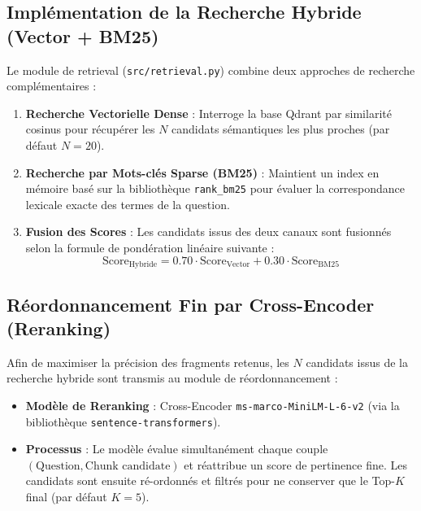 \subsection{Implémentation de la Recherche Hybride (Vector + BM25)}
Le module de retrieval (\texttt{src/retrieval.py}) combine deux approches de recherche complémentaires :
\begin{enumerate}
    \item \textbf{Recherche Vectorielle Dense} : Interroge la base Qdrant par similarité cosinus pour récupérer les $N$ candidats sémantiques les plus proches (par défaut $N=20$).
    \item \textbf{Recherche par Mots-clés Sparse (BM25)} : Maintient un index en mémoire basé sur la bibliothèque \texttt{rank\_bm25} pour évaluer la correspondance lexicale exacte des termes de la question.
    \item \textbf{Fusion des Scores} : Les candidats issus des deux canaux sont fusionnés selon la formule de pondération linéaire suivante :
    \begin{equation}
    \text{Score}_{\text{Hybride}} = 0.70 \cdot \text{Score}_{\text{Vector}} + 0.30 \cdot \text{Score}_{\text{BM25}}
    \end{equation}
\end{enumerate}

\subsection{Réordonnancement Fin par Cross-Encoder (Reranking)}
Afin de maximiser la précision des fragments retenus, les $N$ candidats issus de la recherche hybride sont transmis au module de réordonnancement :
\begin{itemize}
    \item \textbf{Modèle de Reranking} : Cross-Encoder \texttt{ms-marco-MiniLM-L-6-v2} (via la bibliothèque \texttt{sentence-transformers}).
    \item \textbf{Processus} : Le modèle évalue simultanément chaque couple $(\text{Question}, \text{Chunk candidate})$ et réattribue un score de pertinence fine. Les candidats sont ensuite ré-ordonnés et filtrés pour ne conserver que le Top-$K$ final (par défaut $K=5$).
\end{itemize}

